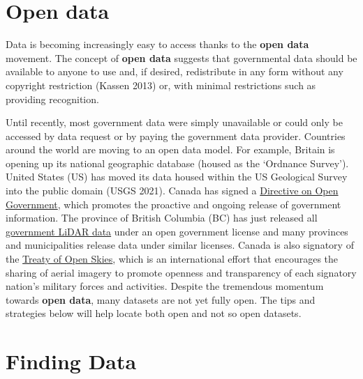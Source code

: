 \documentclass[
]{book}
\begin{document}
\hypertarget{open-data}{%
\section{Open data}\label{open-data}}

Data is becoming increasingly easy to access thanks to the \textbf{open data} movement. The concept of \textbf{open data} suggests that governmental data should be available to anyone to use and, if desired, redistribute in any form without any copyright restriction (Kassen 2013) or, with minimal restrictions such as providing recognition.

Until recently, most government data were simply unavailable or could only be accessed by data request or by paying the government data provider. Countries around the world are moving to an open data model. For example, Britain is opening up its national geographic database (housed as the `Ordnance Survey'). United States (US) has moved its data housed within the US Geological Survey into the public domain (USGS 2021). Canada has signed a \href{https://www.tbs-sct.gc.ca/pol/doc-eng.aspx?id=28108}{Directive on Open Government}, which promotes the proactive and ongoing release of government information. The province of British Columbia (BC) has just released all \href{https://governmentofbc.maps.arcgis.com/apps/MapSeries/index.html?appid=d06b37979b0c4709b7fcf2a1ed458e03}{government LiDAR data} under an open government license and many provinces and municipalities release data under similar licenses. Canada is also signatory of the \href{https://en.wikipedia.org/wiki/Treaty_on_Open_Skies}{Treaty of Open Skies}, which is an international effort that encourages the sharing of aerial imagery to promote openness and transparency of each signatory nation's military forces and activities. Despite the tremendous momentum towards \textbf{open data}, many datasets are not yet fully open. The tips and strategies below will help locate both open and not so open datasets.

\hypertarget{finding-data}{%
\section{Finding Data}\label{finding-data}}
\end{document}
